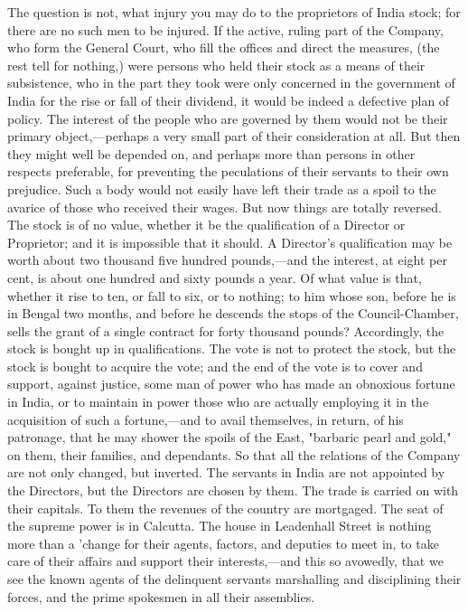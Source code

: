 The question is not, what injury you may do to the proprietors of India stock; for there are no such men to be injured. If the active, ruling part of the Company, who form the General Court, who fill the offices and direct the measures, (the rest tell for nothing,) were persons who held their stock as a means of their subsistence, who in the part they took were only concerned in the government of India for the rise or fall of their dividend, it would be indeed a defective plan of policy. The interest of the people who are governed by them would not be their primary object,—perhaps a very small part of their consideration at all. But then they might well be depended on, and perhaps more than persons in other respects preferable, for preventing the peculations of their servants to their own prejudice. Such a body would not easily have left their trade as a spoil to the avarice of those who received their wages. But now things are totally reversed. The stock is of no value, whether it be the qualification of a Director or Proprietor; and it is impossible that it should. A Director's qualification may be worth about two thousand five hundred pounds,—and the interest, at eight per cent, is about one hundred and sixty pounds a year. Of what value is that, whether it rise to ten, or fall to six, or to nothing; to him whose son, before he is in Bengal two months, and before he descends the stops of the Council-Chamber, sells the grant of a single contract for forty thousand pounds? Accordingly, the stock is bought up in qualifications. The vote is not to protect the stock, but the stock is bought to acquire the vote; and the end of the vote is to cover and support, against justice, some man of power who has made an obnoxious fortune in India, or to maintain in power those who are actually employing it in the acquisition of such a fortune,—and to avail themselves, in return, of his patronage, that he may shower the spoils of the East, "barbaric pearl and gold," on them, their families, and dependants. So that all the relations of the Company are not only changed, but inverted. The servants in India are not appointed by the Directors, but the Directors are chosen by them. The trade is carried on with their capitals. To them the revenues of the country are mortgaged. The seat of the supreme power is in Calcutta. The house in Leadenhall Street is nothing more than a 'change for their agents, factors, and deputies to meet in, to take care of their affairs and support their interests,—and this so avowedly, that we see the known agents of the delinquent servants marshalling and disciplining their forces, and the prime spokesmen in all their assemblies.

